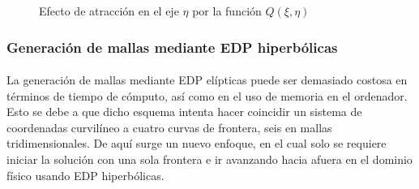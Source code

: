 \documentclass[letterpaper, openright, 12pt]{book}
\begin{document}
        \begin{figure}[htbp!]
            \centering
            \hspace{1cm}
            \caption[Efecto de atracción por función $Q(\xi,\eta)$]{Efecto de
            atracción en el eje $\eta$ por la función $Q(\xi, \eta)$}
            \label{fig:densidad-eta}
        \end{figure}
    \subsubsection{Generación de mallas mediante EDP hiperbólicas}
    \paragraph*{}
        La generación de mallas mediante EDP elípticas puede ser demasiado
        costosa en términos de tiempo de cómputo, así como en el uso de memoria
        en el ordenador. Esto se debe a que dicho esquema intenta hacer
        coincidir un sistema de coordenadas curvilíneo a cuatro curvas de
        frontera, seis en mallas tridimensionales. De aquí surge un nuevo
        enfoque, en el cual solo se requiere iniciar la solución con una sola
        frontera e ir avanzando hacia afuera en el dominio físico usando EDP
        hiperbólicas. \cite{farrashkhalvat}
\end{document}

